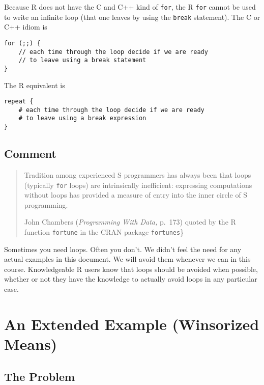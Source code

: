 \documentclass[
]{article}
\begin{document}
Because R does not have the C and C++ kind of \texttt{for}, the R
\texttt{for} cannot be used to write an infinite loop (that one leaves
by using the \texttt{break} statement). The C or C++ idiom is

\begin{verbatim}
for (;;) {
    // each time through the loop decide if we are ready
    // to leave using a break statement
}
\end{verbatim}

The R equivalent is

\begin{verbatim}
repeat {
    # each time through the loop decide if we are ready
    # to leave using a break expression
}
\end{verbatim}

\hypertarget{comment}{%
\subsection{Comment}\label{comment}}

\begin{quote}
Tradition among experienced S programmers has always been that loops
(typically \texttt{for} loops) are intrinsically inefficient: expressing
computations without loops has provided a measure of entry into the
inner circle of S programming.

John Chambers (\emph{Programming With Data,} p.~173) quoted by the R
function \texttt{fortune} in the CRAN package \texttt{fortunes}\}
\end{quote}

Sometimes you need loops. Often you don't. We didn't feel the need for
any actual examples in this document. We will avoid them whenever we can
in this course. Knowledgeable R users know that loops should be avoided
when possible, whether or not they have the knowledge to actually avoid
loops in any particular case.

\hypertarget{an-extended-example-winsorized-means}{%
\section{An Extended Example (Winsorized
Means)}\label{an-extended-example-winsorized-means}}

\hypertarget{the-problem}{%
\subsection{The Problem}\label{the-problem}}
\end{document}
